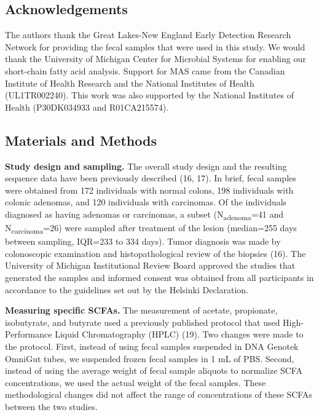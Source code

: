 \documentclass[11pt,]{article}
\begin{document}
\hypertarget{acknowledgements}{%
\subsection{Acknowledgements}\label{acknowledgements}}

The authors thank the Great Lakes-New England Early Detection Research
Network for providing the fecal samples that were used in this study. We
would thank the University of Michigan Center for Microbial Systems for
enabling our short-chain fatty acid analysis. Support for MAS came from
the Canadian Institute of Health Research and the National Institutes of
Health (UL1TR002240). This work was also supported by the National
Institutes of Health (P30DK034933 and R01CA215574).

\newpage

\hypertarget{materials-and-methods}{%
\subsection{Materials and Methods}\label{materials-and-methods}}

\textbf{Study design and sampling.} The overall study design and the
resulting sequence data have been previously described (16, 17). In
brief, fecal samples were obtained from 172 individuals with normal
colons, 198 individuals with colonic adenomas, and 120 individuals with
carcinomas. Of the individuals diagnosed as having adenomas or
carcinomas, a subset (N\textsubscript{adenoma}=41 and
N\textsubscript{carcinoma}=26) were sampled after treatment of the
lesion (median=255 days between sampling, IQR=233 to 334 days). Tumor
diagnosis was made by colonoscopic examination and histopathological
review of the biopsies (16). The University of Michigan Institutional
Review Board approved the studies that generated the samples and
informed consent was obtained from all participants in accordance to the
guidelines set out by the Helsinki Declaration.

\textbf{Measuring specific SCFAs.} The measurement of acetate,
propionate, isobutyrate, and butyrate used a previously published
protocol that used High-Performance Liquid Chromatography (HPLC) (19).
Two changes were made to the protocol. First, instead of using fecal
samples suspended in DNA Genotek OmniGut tubes, we suspended frozen
fecal samples in 1 mL of PBS. Second, instead of using the average
weight of fecal sample aliquots to normalize SCFA concentrations, we
used the actual weight of the fecal samples. These methodological
changes did not affect the range of concentrations of these SCFAs
between the two studies.
\end{document}
